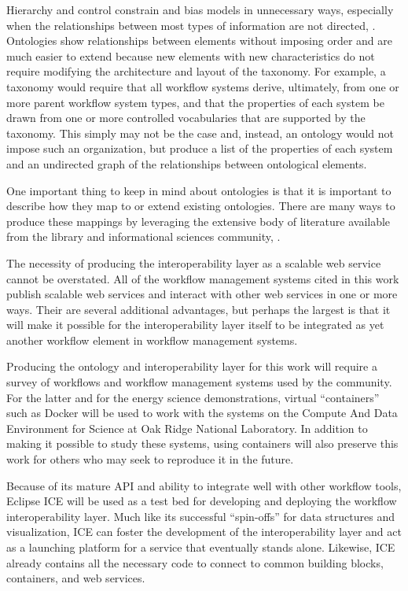 Hierarchy and control constrain and bias models in unnecessary ways,
especially when the relationships between most types of information are
not directed, \cite{weinberger_everything_2008}. Ontologies show relationships
between elements without imposing order and are much easier to extend
because new elements with new characteristics do not require modifying
the architecture and layout of the taxonomy. For example, a taxonomy
would require that all workflow systems derive, ultimately, from one or
more parent workflow system types, and that the properties of each
system be drawn from one or more controlled vocabularies that are
supported by the taxonomy. This simply may not be the case and, instead,
an ontology would not impose such an organization, but produce a list of
the properties of each system and an undirected graph of the
relationships between ontological elements.

One important thing to keep in mind about ontologies is that it is
important to describe how they map to or extend existing ontologies.
There are many ways to produce these mappings by leveraging the
extensive body of literature available from the library and
informational sciences community, \cite{allemang_semantic_2008}.

The necessity of producing the interoperability layer as a scalable web
service cannot be overstated. All of the workflow management systems
cited in this work publish scalable web services and interact with other
web services in one or more ways. Their are several additional advantages, but
perhaps the largest is that it will make it possible for the interoperability
layer itself to be integrated as yet another workflow element in
workflow management systems.

Producing the ontology and interoperability layer for this work will
require a survey of workflows and workflow management systems used by the
community. For the latter and for the energy science demonstrations,
virtual ``containers'' such as Docker will be used to work with the
systems on the Compute And Data Environment for Science at
Oak Ridge National Laboratory. In addition to making it possible to
study these systems, using containers will also preserve this work for
others who may seek to reproduce it in the future.

Because of its mature API and ability to integrate well with other workflow
tools, Eclipse ICE will be used as a test bed for developing and deploying the
workflow interoperability layer. Much like its successful ``spin-offs'' for data
structures and visualization, ICE can foster the development of the
interoperability layer and act as a launching platform for a service that
eventually stands alone. Likewise, ICE already contains all the necessary code
to connect to common building blocks, containers, and web services.
